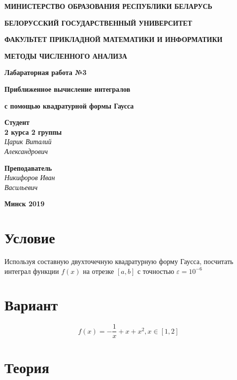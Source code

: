 \documentclass{article}
\begin{document}
\begin{titlepage}



\centerline{\large \bf МИНИСТЕРСТВО ОБРАЗОВАНИЯ РЕСПУБЛИКИ БЕЛАРУСЬ}
\bigskip
\bigskip
\centerline{\large \bf БЕЛОРУССКИЙ ГОСУДАРСТВЕННЫЙ УНИВЕРСИТЕТ}
\bigskip
\bigskip
\centerline{\large \bf ФАКУЛЬТЕТ ПРИКЛАДНОЙ МАТЕМАТИКИ И ИНФОРМАТИКИ}
\vfill
\centerline{\Large \bf МЕТОДЫ ЧИСЛЕННОГО АНАЛИЗА}
\bigskip
\vfill

\centerline{\Large \bf Лабараторная работа №3}
\bigskip
\centerline{\Large \bf Приближенное вычисление интегралов}
\centerline{\Large \bf с помощью квадратурной формы Гаусса}
\vfill

\hfill
\begin{minipage}{0.25\textwidth}
	{\large{\bf Студент \\ 2 курса 2 группы} \\
		{\it Царик Виталий \\ Александрович }}
\end{minipage}

\vfill
\hfill
\begin{minipage}{0.25\textwidth}
  {\large{\bf Преподаватель} \\
{\it Никифоров Иван \\ Васильевич}}
\end{minipage}
\vfill
\vfill
\centerline{\Large \bf Минск 2019}

\end{titlepage}

\restoregeometry

\section{Условие}
Используя составную двухточечную квадратурную форму Гаусса, посчитать интеграл функции $f(x)$ на отрезке $[a,b]$ с точностью $\varepsilon = 10^{-6}$

\section{Вариант}
\begin{equation}
\label{eq:variant}
f(x) = -\frac{1}{x} + x + x^2, x \in [1, 2]
\end{equation}

\section{Теория}
\end{document}
